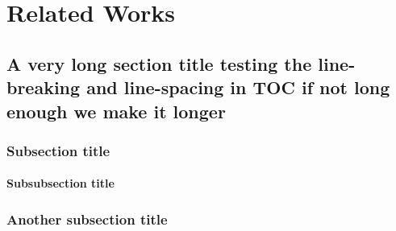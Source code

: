 \chapter{Related Works}
\label{chap:related}

\section{A very long section title testing the line-breaking and line-spacing in TOC if not long enough we make it longer}
\subsection{Subsection title}
\lipsum{}
\subsubsection{Subsubsection title}
\lipsum[1]
\subsection{Another subsection title}
